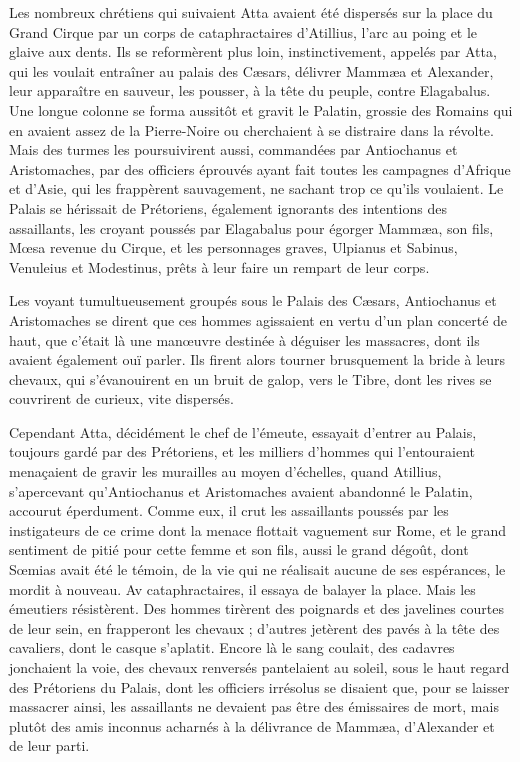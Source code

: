 \documentclass[a4paper, 11pt, oneside, polutonikogreek, french]{article}
\begin{document}
Les nombreux chrétiens qui suivaient Atta avaient été dispersés sur la place du Grand Cirque par un corps de cataphractaires d'Atillius, l'arc au poing et le glaive aux dents. Ils se reformèrent plus loin, instinctivement, appelés par Atta, qui les voulait entraîner au palais des Cæsars, délivrer Mammæa et Alexander, leur apparaître en sauveur, les pousser, à la tête du peuple, contre Elagabalus. Une longue colonne se forma aussitôt et gravit le Palatin, grossie des Romains qui en avaient assez de la Pierre-Noire ou cherchaient à se distraire dans la révolte. Mais des turmes les poursuivirent aussi, commandées par Antiochanus et Aristomaches, par des officiers éprouvés ayant fait toutes les campagnes d'Afrique et d'Asie, qui les frappèrent sauvagement, ne sachant trop ce qu'ils voulaient. Le Palais se hérissait de Prétoriens, également ignorants des intentions des assaillants, les croyant poussés par Elagabalus pour égorger Mammæa, son fils, Mœsa revenue du Cirque, et les personnages graves, Ulpianus et Sabinus, Venuleius et Modestinus, prêts à leur faire un rempart de leur corps.

Les voyant tumultueusement groupés sous le Palais des Cæsars, Antiochanus et Aristomaches se dirent que ces hommes agissaient en vertu d'un plan concerté de haut, que c'était là une manœuvre destinée à déguiser les massacres, dont ils avaient également ouï parler. Ils firent alors tourner brusquement la bride à leurs chevaux, qui s'évanouirent en un bruit de galop, vers le Tibre, dont les rives se couvrirent de curieux, vite dispersés.

Cependant Atta, décidément le chef de l'émeute, essayait d'entrer au Palais, toujours gardé par des Prétoriens, et les milliers d'hommes qui l'entouraient menaçaient de gravir les murailles au moyen d'échelles, quand Atillius, s'apercevant qu'Antiochanus et Aristomaches avaient abandonné le Palatin, accourut éperdument. Comme eux, il crut les assaillants poussés par les instigateurs de ce crime dont la menace flottait vaguement sur Rome, et le grand sentiment de pitié pour cette femme et son fils, aussi le grand dégoût, dont Sœmias avait été le témoin, de la vie qui ne réalisait aucune de ses espérances, le mordit à nouveau. Av cataphractaires, il essaya de balayer la place. Mais les émeutiers résistèrent. Des hommes tirèrent des poignards et des javelines courtes de leur sein, en frapperont les chevaux ; d'autres jetèrent des pavés à la tête des cavaliers, dont le casque s'aplatit. Encore là le sang coulait, des cadavres jonchaient la voie, des chevaux renversés pantelaient au soleil, sous le haut regard des Prétoriens du Palais, dont les officiers irrésolus se disaient que, pour se laisser massacrer ainsi, les assaillants ne devaient pas être des émissaires de mort, mais plutôt des amis inconnus acharnés à la délivrance de Mammæa, d'Alexander et de leur parti.
\end{document}
